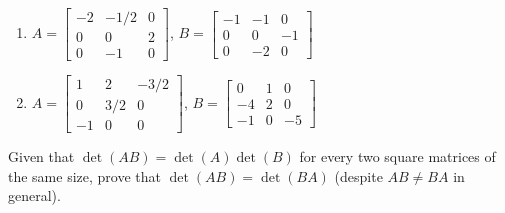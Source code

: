 \begin{exercise}
\begin{enumerate}

\item \(A=\begin{bmatrix} -2&-1/2&0
\\0&0&2
\\0&-1&0 \end{bmatrix}\), 
\(B=\begin{bmatrix} -1&-1&0
\\0&0&-1
\\0&-2&0 \end{bmatrix}\)

\item \(A=\begin{bmatrix} 1&2&-3/2
\\0&3/2&0
\\-1&0&0 \end{bmatrix}\), 
\(B=\begin{bmatrix} 0&1&0
\\-4&2&0
\\-1&0&-5 \end{bmatrix}\)

\end{enumerate}
\end{exercise}




\begin{exercise}  
Given that \(\det(AB)=\det(A)\det(B)\) for every two square matrices of the same size, prove that \(\det(AB)=\det(BA)\) (despite \(AB\neq BA\) in general).
\end{exercise}




